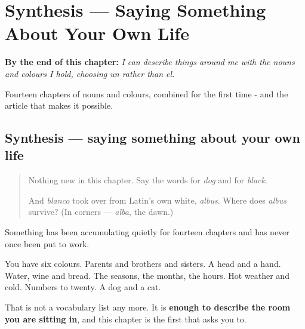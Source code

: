 
\chapter{Synthesis --- Saying Something About Your Own Life}
\label{ch:spanish-synthesis-describing}

\begin{chapteropening}
\textbf{By the end of this chapter:} \emph{I can describe things around me with the nouns and colours I hold, choosing un rather than el.}

Fourteen chapters of nouns and colours, combined for the first time - and the article that makes it possible.
\end{chapteropening}

\section[Practice]{Synthesis — saying something about your own life}

\label{lesson:ES-C40-sintesis-describir}



\begin{quote}
Nothing new in this chapter. Say the words for \emph{dog} and for \emph{black}.

And \emph{blanco} took over from Latin's own white, \emph{albus}. Where does \emph{albus} survive? (In corners — \emph{alba}, the dawn.)
\end{quote}

\begin{grammarlens}[title={What you've built}]
Something has been accumulating quietly for fourteen chapters and has never once been put to work.

You have six colours. Parents and brothers and sisters. A head and a hand. Water, wine and bread. The seasons, the months, the hours. Hot weather and cold. Numbers to twenty. A dog and a cat.

That is not a vocabulary list any more. It is \textbf{enough to describe the room you are sitting in}, and this chapter is the first that asks you to.
\end{grammarlens}

